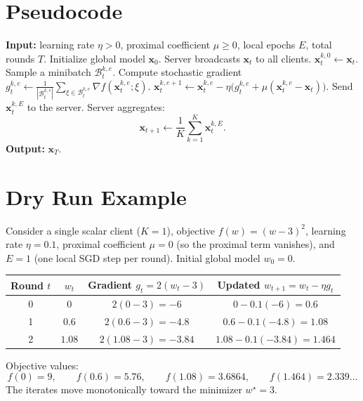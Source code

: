 \documentclass{article}
\begin{document}
\section*{Pseudocode}
\begin{algorithm}[H]
\caption{FedProx with Local SGD}
\begin{algorithmic}[1]
\State \textbf{Input:} learning rate $\eta>0$, proximal coefficient $\mu\ge0$, local epochs $E$, total rounds $T$.
\State Initialize global model $\mathbf{x}_0$.
    \State Server broadcasts $\mathbf{x}_t$ to all clients.
        \State $\mathbf{x}_{t}^{k,0}\gets\mathbf{x}_t$.
            \State Sample a minibatch $\mathcal{B}_{t}^{k,e}$.
            \State Compute stochastic gradient 
            $g_{t}^{k,e}\gets \frac{1}{|\mathcal{B}_{t}^{k,e}|}\sum_{\xi\in\mathcal{B}_{t}^{k,e}}\nabla f(\mathbf{x}_{t}^{k,e};\xi)$.
            \State $\mathbf{x}_{t}^{k,e+1}\gets \mathbf{x}_{t}^{k,e}
                -\eta\bigl(g_{t}^{k,e}+\mu(\mathbf{x}_{t}^{k,e}-\mathbf{x}_t)\bigr)$.
        \EndFor
        \State Send $\mathbf{x}_{t}^{k,E}$ to the server.
    \EndFor
    \State Server aggregates:
    \[
        \mathbf{x}_{t+1}\gets\frac{1}{K}\sum_{k=1}^{K}\mathbf{x}_{t}^{k,E}.
    \]
\EndFor
\State \textbf{Output:} $\mathbf{x}_T$.
\end{algorithmic}
\end{algorithm}

\section*{Dry Run Example}
Consider a single scalar client ($K=1$), objective $f(w)=(w-3)^2$, learning rate $\eta=0.1$, proximal coefficient $\mu=0$ (so the proximal term vanishes), and $E=1$ (one local SGD step per round).  
Initial global model $w_0=0$.

\begin{tabular}{@{}cccc@{}}
\toprule
Round $t$ & $w_t$ & Gradient $g_t=2(w_t-3)$ & Updated $w_{t+1}=w_t-\eta g_t$ \\
\midrule
0 & $0$ & $2(0-3)=-6$ & $0-0.1(-6)=0.6$ \\
1 & $0.6$ & $2(0.6-3)=-4.8$ & $0.6-0.1(-4.8)=1.08$ \\
2 & $1.08$ & $2(1.08-3)=-3.84$ & $1.08-0.1(-3.84)=1.464$ \\
\bottomrule
\end{tabular}

Objective values:
\[
    f(0)=9,\qquad f(0.6)=5.76,\qquad f(1.08)=3.6864,\qquad f(1.464)=2.339\ldots
\]
The iterates move monotonically toward the minimizer $w^\star=3$.
\end{document}
